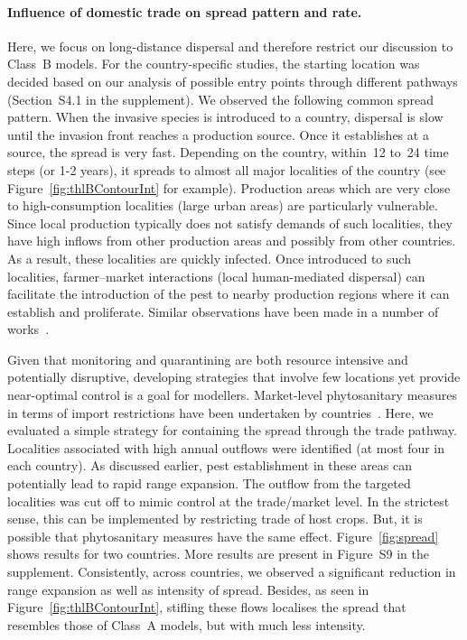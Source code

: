 \documentclass[11pt]{article}
\theoremstyle{definition}
\begin{document}
\paragraph{Influence of domestic trade on spread pattern and rate.}
Here, we focus on long-distance dispersal and therefore restrict our
discussion to Class~B models. For the country-specific studies, the
starting location was decided based on our analysis of possible entry
points through different pathways (Section~S4.1 in the
supplement).  We observed the following common spread pattern.  When the
invasive species is introduced to a country, dispersal is slow until the
invasion front reaches a {production source}. Once it establishes at a
source, the spread is very fast.  Depending on the country, within~12 to~24
time steps (or 1-2 years), it spreads to almost all major localities of
the country (see Figure~\ref{fig:thlBContourInt} for example). Production
areas which are very close to high-consumption localities (large urban
areas) are particularly vulnerable. Since local production typically does
not satisfy demands of such localities, they have high inflows from other
production areas and possibly from other countries. As a result, these
localities are quickly infected. Once introduced to such localities,
farmer--market interactions (local human-mediated dispersal) can facilitate
the introduction of the pest to nearby production regions where it can
establish and proliferate. Similar observations have been made in a number
of works~\cite{kiss2006network,pautasso2010disease}.

Given that monitoring and quarantining are both resource intensive and
potentially disruptive, developing strategies that involve few locations
yet provide near-optimal control is a goal for modellers.  Market-level
phytosanitary measures in terms of import restrictions have been undertaken
by countries~\cite{USDA2012}. Here, we evaluated a simple strategy for
containing the spread through the trade pathway. Localities associated with
high annual outflows were identified (at most four in each country). As
discussed earlier, pest establishment in these areas can potentially lead
to rapid range expansion. The outflow from the targeted localities was cut
off to mimic control at the trade/market level. In the strictest sense,
this can be implemented by restricting trade of host crops. But, it is
possible that phytosanitary measures have the same effect.
Figure~\ref{fig:spread} shows results for two countries.  More results are
present in Figure~S9 in the supplement.  Consistently,
across countries, we observed a significant reduction in range expansion as
well as intensity of spread.  Besides, as seen in
Figure~\ref{fig:thlBContourInt}, stifling these flows localises the spread
that resembles those of Class~A models, but with much less intensity.
\end{document}
